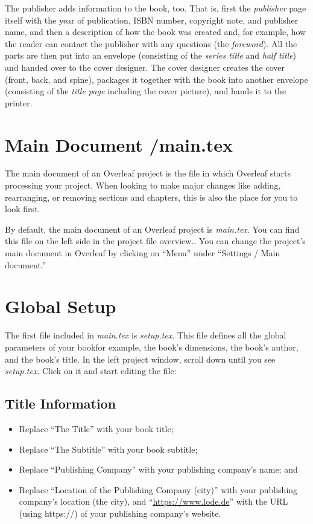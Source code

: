 The publisher adds information to the book, too. That is, first the \textit{publisher} page itself with the year of publication, ISBN number, copyright note, and publisher name, and then a description of how the book was created and, for example, how the reader can contact the publisher with any questions (the \textit{foreword}). All the parts are then put into an envelope (consisting of the \textit{series title} and \textit{half title}) and handed over to the cover designer. The cover designer creates the cover (front, back, and spine), packages it together with the book into another envelope (consisting of the \textit{title page} including the cover picture), and hands it to the printer.

\section{Main Document /main.tex}
\label{entrypoint:sec}

The main document of an Overleaf project is the file in which Overleaf starts processing your project. When looking to make major changes like adding, rearranging, or removing sections and chapters, this is also the place for you to look first.

By default, the main document of an Overleaf project is \textit{main.tex}. You can find this file on the left side in the project file overview.. You can change the project's main document in Overleaf by clicking on ``Menu'' under ``Settings / Main document.''


\section{Global Setup}
\label{globalsetup:sec}

The first file included in \textit{main.tex} is \textit{setup.tex}. This file defines all the global parameters of your book\emdash{}for example, the book's dimensions, the book's author, and the book's title. In the left project window, scroll down until you see \textit{setup.tex}. Click on it and start editing the file:


\subsection{Title Information}

\begin{itemize}
\item Replace ``The Title'' with your book title;
\item Replace ``The Subtitle'' with your book subtitle;
\item Replace ``Publishing Company'' with your publishing company's name; and
\item Replace ``Location of the Publishing Company (city)'' with your publishing company's location (the city), and ``\url{https://www.lode.de}'' with the URL (using https://) of your publishing company's website.
\end{itemize}


